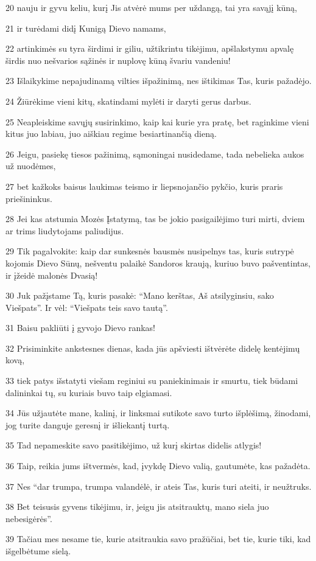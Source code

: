 \par 20 nauju ir gyvu keliu, kurį Jis atvėrė mums per uždangą, tai yra savąjį kūną, 
\par 21 ir turėdami didį Kunigą Dievo namams, 
\par 22 artinkimės su tyra širdimi ir giliu, užtikrintu tikėjimu, apšlakstymu apvalę širdis nuo nešvarios sąžinės ir nuplovę kūną švariu vandeniu! 
\par 23 Išlaikykime nepajudinamą vilties išpažinimą, nes ištikimas Tas, kuris pažadėjo. 
\par 24 Žiūrėkime vieni kitų, skatindami mylėti ir daryti gerus darbus. 
\par 25 Neapleiskime savųjų susirinkimo, kaip kai kurie yra pratę, bet raginkime vieni kitus juo labiau, juo aiškiau regime besiartinančią dieną. 
\par 26 Jeigu, pasiekę tiesos pažinimą, sąmoningai nusidedame, tada nebelieka aukos už nuodėmes, 
\par 27 bet kažkoks baisus laukimas teismo ir liepsnojančio pykčio, kuris praris priešininkus. 
\par 28 Jei kas atstumia Mozės Įstatymą, tas be jokio pasigailėjimo turi mirti, dviem ar trims liudytojams paliudijus. 
\par 29 Tik pagalvokite: kaip dar sunkesnės bausmės nusipelnys tas, kuris sutrypė kojomis Dievo Sūnų, nešventu palaikė Sandoros kraują, kuriuo buvo pašventintas, ir įžeidė malonės Dvasią! 
\par 30 Juk pažįstame Tą, kuris pasakė: “Mano kerštas, Aš atsilyginsiu,­ sako Viešpats”. Ir vėl: “Viešpats teis savo tautą”. 
\par 31 Baisu pakliūti į gyvojo Dievo rankas! 
\par 32 Prisiminkite ankstesnes dienas, kada jūs apšviesti ištvėrėte didelę kentėjimų kovą, 
\par 33 tiek patys išstatyti viešam reginiui su paniekinimais ir smurtu, tiek būdami dalininkai tų, su kuriais buvo taip elgiamasi. 
\par 34 Jūs užjautėte mane, kalinį, ir linksmai sutikote savo turto išplėšimą, žinodami, jog turite danguje geresnį ir išliekantį turtą. 
\par 35 Tad nepameskite savo pasitikėjimo, už kurį skirtas didelis atlygis! 
\par 36 Taip, reikia jums ištvermės, kad, įvykdę Dievo valią, gautumėte, kas pažadėta. 
\par 37 Nes “dar trumpa, trumpa valandėlė, ir ateis Tas, kuris turi ateiti, ir neužtruks. 
\par 38 Bet teisusis gyvens tikėjimu, ir, jeigu jis atsitrauktų, mano siela juo nebesigėrės”. 
\par 39 Tačiau mes nesame tie, kurie atsitraukia savo pražūčiai, bet tie, kurie tiki, kad išgelbėtume sielą.


